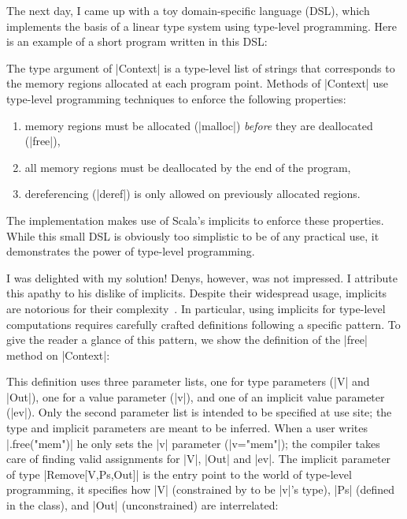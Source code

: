 The next day, I came up with a toy domain-specific language (DSL), which implements the basis of a linear type system using type-level programming.
Here is an example of a short program written in this DSL:

\memImplicitMain

\noindent
The type argument of |Context| is a type-level list of strings that corresponds to the memory regions allocated at each program point.
Methods of |Context| use type-level programming techniques to enforce the following properties:

\begin{enumerate}
  \item memory regions must be allocated (|malloc|) \emph{before} they are deallocated (|free|),
  \item all memory regions must be deallocated by the end of the program,
  \item dereferencing (|deref|) is only allowed on previously allocated regions.
\end{enumerate}

\noindent
The implementation makes use of Scala's implicits to enforce these properties.
While this small DSL is obviously too simplistic to be of any practical use, it demonstrates the power of type-level programming.

I was delighted with my solution!
Denys, however, was not impressed.
I attribute this apathy to his dislike of implicits.
Despite their widespread usage, implicits are notorious for their complexity~\citep{kvrikava2019scala}.
In particular, using implicits for type-level computations requires carefully crafted definitions following a specific pattern.
To give the reader a glance of this pattern, we show the definition of the |free| method on |Context|:

\memImplicitContextFree

\noindent
This definition uses three parameter lists, one for type parameters (|V| and |Out|), one for a value parameter (|v|), and one of an implicit value parameter (|ev|).
Only the second parameter list is intended to be specified at use site; the type and implicit parameters are meant to be inferred.
When a user writes |.free("mem")| he only sets the |v| parameter (|v="mem"|); the compiler takes care of finding valid assignments for |V|, |Out| and |ev|.
The implicit parameter of type |Remove[V,Ps,Out]| is the entry point to the world of type-level programming, it specifies how |V| (constrained by to be |v|'s type), |Ps| (defined in the class), and |Out| (unconstrained) are interrelated:

